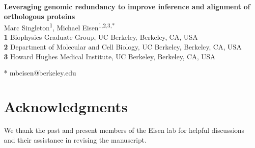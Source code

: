 \documentclass[11pt,letterpaper]{article}
\begin{document}
\graphicspath{{./figures/}}

\begin{flushleft}
{\Large\textbf{Leveraging genomic redundancy to improve inference and alignment of orthologous proteins}}
\newline
\\
Marc Singleton\textsuperscript{1},
Michael Eisen\textsuperscript{1,2,3,*}
\\
\bigskip
\textbf{1} Biophysics Graduate Group, UC Berkeley, Berkeley, CA, USA
\\
\textbf{2} Department of Molecular and Cell Biology, UC Berkeley, Berkeley, CA, USA
\\
\textbf{3} Howard Hughes Medical Institute, UC Berkeley, Berkeley, CA, USA
\\
\bigskip

* mbeisen@berkeley.edu

\end{flushleft}



\section*{Acknowledgments}
We thank the past and present members of the Eisen lab for helpful discussions and their assistance in revising the manuscript.

\printbibliography

\clearpage

\setcounter{figure}{0}
\renewcommand{\thefigure}{S\arabic{figure}}

\renewcommand{\thefigure}{\arabic{figure}}
\end{document}
